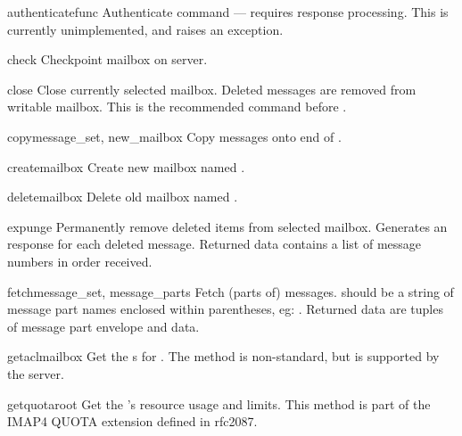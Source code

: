\begin{methoddesc}{authenticate}{func}
  Authenticate command --- requires response processing. This is
  currently unimplemented, and raises an exception. 
\end{methoddesc}

\begin{methoddesc}{check}{}
  Checkpoint mailbox on server. 
\end{methoddesc}

\begin{methoddesc}{close}{}
  Close currently selected mailbox. Deleted messages are removed from
  writable mailbox. This is the recommended command before
  .
\end{methoddesc}

\begin{methoddesc}{copy}{message_set, new_mailbox}
  Copy  messages onto end of . 
\end{methoddesc}

\begin{methoddesc}{create}{mailbox}
  Create new mailbox named .
\end{methoddesc}

\begin{methoddesc}{delete}{mailbox}
  Delete old mailbox named .
\end{methoddesc}

\begin{methoddesc}{expunge}{}
  Permanently remove deleted items from selected mailbox. Generates an
   response for each deleted message. Returned data
  contains a list of  message numbers in order
  received.
\end{methoddesc}

\begin{methoddesc}{fetch}{message_set, message_parts}
  Fetch (parts of) messages.   should be
  a string of message part names enclosed within parentheses,
  eg: .  Returned data are tuples
  of message part envelope and data.
\end{methoddesc}

\begin{methoddesc}{getacl}{mailbox}
  Get the s for .
  The method is non-standard, but is supported by the  server.
\end{methoddesc}

\begin{methoddesc}{getquota}{root}
  Get the  's resource usage and limits.
  This method is part of the IMAP4 QUOTA extension defined in rfc2087.
\end{methoddesc}

